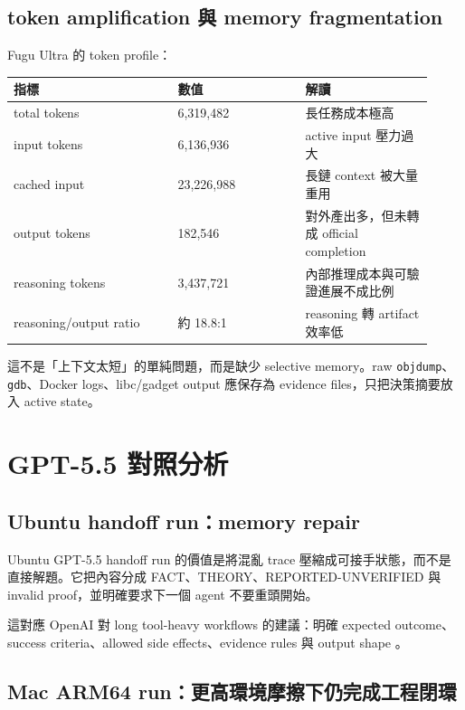 \documentclass[UTF8,a4paper,11pt]{ctexart}
\newcommand{\code}[1]{\texttt{#1}}
\begin{document}
\subsection{token amplification 與 memory fragmentation}

Fugu Ultra 的 token profile：

\begin{longtable}{L{0.36\linewidth} L{0.28\linewidth} L{0.28\linewidth}}
\toprule
指標 & 數值 & 解讀\\
\midrule
total tokens & 6,319,482 & 長任務成本極高\\
input tokens & 6,136,936 & active input 壓力過大\\
cached input & 23,226,988 & 長鏈 context 被大量重用\\
output tokens & 182,546 & 對外產出多，但未轉成 official completion\\
reasoning tokens & 3,437,721 & 內部推理成本與可驗證進展不成比例\\
reasoning/output ratio & 約 18.8:1 & reasoning 轉 artifact 效率低\\
\bottomrule
\end{longtable}

這不是「上下文太短」的單純問題，而是缺少 selective memory。raw \code{objdump}、\code{gdb}、Docker logs、libc/gadget output 應保存為 evidence files，只把決策摘要放入 active state。

\section{GPT-5.5 對照分析}

\subsection{Ubuntu handoff run：memory repair}

Ubuntu GPT-5.5 handoff run 的價值是將混亂 trace 壓縮成可接手狀態，而不是直接解題。它把內容分成 FACT、THEORY、REPORTED-UNVERIFIED 與 invalid proof，並明確要求下一個 agent 不要重頭開始。

這對應 OpenAI 對 long tool-heavy workflows 的建議：明確 expected outcome、success criteria、allowed side effects、evidence rules 與 output shape \citep{openaigpt55,openaievalskills,openaiagentimprovementloop}。

\subsection{Mac ARM64 run：更高環境摩擦下仍完成工程閉環}
\end{document}

